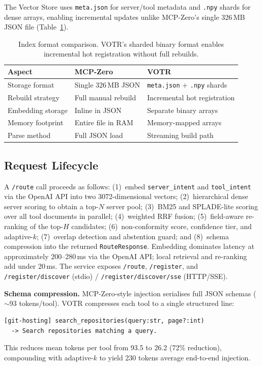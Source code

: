 \documentclass[sigconf,anonymous,review]{acmart}
\newcommand{\votr}{\textsc{VOTR}\xspace}
\newcommand{\mcpzero}{MCP-Zero\xspace}
\begin{document}
The Vector Store uses \texttt{meta.json} for server/tool metadata and \texttt{.npy}
shards for dense arrays, enabling incremental updates unlike \mcpzero's single
326\,MB JSON file (Table~\ref{tab:index}).

\begin{table}[t]
\centering
\small
\caption{Index format comparison. VOTR's sharded binary format enables incremental
hot registration without full rebuilds.}
\label{tab:index}
\begin{tabular}{@{}lll@{}}
\toprule
Aspect & \mcpzero & \votr \\
\midrule
Storage format    & Single 326\,MB JSON & \texttt{meta.json} + \texttt{.npy} shards \\
Rebuild strategy  & Full manual rebuild & Incremental hot registration \\
Embedding storage & Inline in JSON      & Separate binary arrays \\
Memory footprint  & Entire file in RAM  & Memory-mapped arrays \\
Parse method      & Full JSON load      & Streaming build path \\
\bottomrule
\end{tabular}
\end{table}

\subsection{Request Lifecycle}
A \texttt{/route} call proceeds as follows:
(1)~embed \texttt{server\_intent} and \texttt{tool\_intent} via the OpenAI API into
two 3072-dimensional vectors;
(2)~hierarchical dense server scoring to obtain a top-$N$ server pool;
(3)~BM25 and SPLADE-lite scoring over all tool documents in parallel;
(4)~weighted RRF fusion;
(5)~field-aware re-ranking of the top-$H$ candidates;
(6)~non-conformity score, confidence tier, and adaptive-$k$;
(7)~overlap detection and abstention guard; and
(8)~schema compression into the returned \texttt{RouteResponse}.
Embedding dominates latency at approximately 200--280\,ms via the OpenAI API;
local retrieval and re-ranking add under 20\,ms.
The service exposes \texttt{/route}, \texttt{/register}, and
\texttt{/register/discover} (stdio) / \texttt{/register/discover/sse} (HTTP/SSE).

\textbf{Schema compression.}
\mcpzero-style injection serialises full JSON schemas ($\sim$93 tokens/tool).
\votr compresses each tool to a single structured line:
\begin{lstlisting}
[git-hosting] search_repositories(query:str, page?:int)
  -> Search repositories matching a query.
\end{lstlisting}
This reduces mean tokens per tool from 93.5 to 26.2 (72\% reduction), compounding
with adaptive-$k$ to yield 230 tokens average end-to-end injection.
\end{document}
